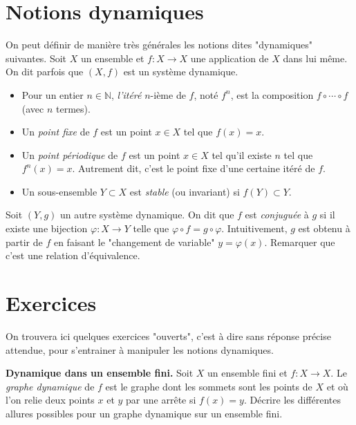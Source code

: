 \documentclass{article}
\begin{document}
\section{Notions dynamiques}
\label{sec:notions_dynamiques}

On peut définir de manière très générales les notions
dites "dynamiques" suivantes.
Soit $ X $ un ensemble
et $ f : X \to X $
une application de $ X $ dans lui même.
On dit parfois que
$ (X,f) $
est un système dynamique.

\begin{itemize}
        \item
      	  Pour un entier $ n \in \mathbb{N} $,
      	  \emph{l'itéré} $n$-ième de $ f $,
      	  noté $ f^{n} $,
      	  est la composition
      	  $ f \circ \cdots \circ f $
      	  (avec $ n $ termes).

        \item Un \emph{point fixe}
      	  de $ f $ 
      	  est un point $ x \in X $
      	  tel que $ f(x) = x $.
        \item Un
      	  \emph{point périodique}
      	  de $ f $
      	  est un point $ x \in X $
      	  tel qu'il existe $ n $
      	  tel que $ f^n(x) = x $.
      	  Autrement dit,
      	  c'est le point fixe
      	  d'une certaine itéré
      	  de $ f $.
        \item Un sous-ensemble
      	  $ Y \subset X $
      	  est \emph{stable}
      	  (ou invariant)
      	  si $ f(Y) \subset Y $.
\end{itemize}

Soit
$ (Y,g) $
un autre système dynamique.
On dit que
$ f $ est
\emph{conjuguée}
à
$ g $
si il existe
une bijection
$ \varphi : X \to Y $
telle que
$ \varphi \circ f = g \circ \varphi $.
Intuitivement,
$ g $ est obtenu à partir de $ f $
en faisant le "changement de variable"
$ y = \varphi(x) $.
Remarquer que c'est une relation d'équivalence.

\section{Exercices}
\label{sec:exercices}

On trouvera ici quelques exercices
"ouverts", c'est à dire sans réponse précise attendue,
pour s'entrainer à manipuler les notions dynamiques.

\textbf{Dynamique dans un ensemble fini.}
Soit $ X $ un ensemble fini
et $ f : X \to X $.
Le \emph{graphe dynamique}
de $ f $ est le graphe
dont les sommets sont les points de $ X $
et où l'on relie deux points
$ x $ et $ y $ par une arrête si
$ f(x) = y $.
Décrire les différentes allures
possibles pour un graphe dynamique
sur un ensemble fini.
\end{document}
